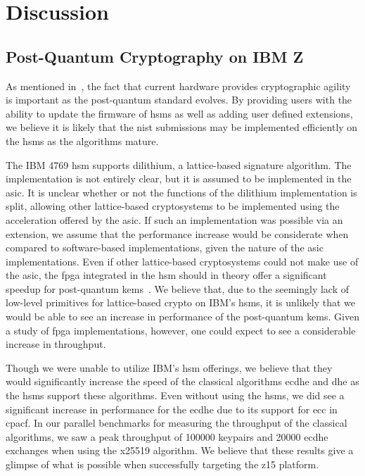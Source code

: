 \chapter{Discussion}
\label{chapter:discussion}

\section{Post-Quantum Cryptography on IBM Z}

As mentioned in~\cite{microsoft2020, ibm:z15:2019}, the fact that current hardware provides cryptographic agility is important as the \gls{post-quantum} standard evolves. By providing users with the ability to update the firmware of \glspl{hsm} as well as adding user defined extensions, we believe it is likely that the \gls{nist} submissions may be implemented efficiently on the \glspl{hsm} as the algorithms mature.

The IBM 4769 \gls{hsm} supports \gls{dilithium}, a lattice-based signature algorithm. The implementation is not entirely clear, but it is assumed to be implemented in the \gls{asic}. It is unclear whether or not the functions of the \gls{dilithium} implementation is split, allowing other lattice-based cryptosystems to be implemented using the acceleration offered by the \gls{asic}. If such an implementation was possible via an extension, we assume that the performance increase would be considerate when compared to software-based implementations, given the nature of the \gls{asic} implementations. Even if other lattice-based cryptosystems could not make use of the \gls{asic}, the \gls{fpga} integrated in the \gls{hsm} should in theory offer a significant speedup for \gls{post-quantum} \glspl{kem}~\cite{zhu2021, roy2020}. We believe that, due to the seemingly lack of low-level primitives for lattice-based crypto on IBM's \glspl{hsm}, it is unlikely that we would be able to see an increase in performance of the \gls{post-quantum} \glspl{kem}. Given a study of \gls{fpga} implementations, however, one could expect to see a considerable increase in throughput.

Though we were unable to utilize IBM's \gls{hsm} offerings, we believe that they would significantly increase the speed of the classical algorithms \gls{ecdhe} and \gls{dhe} as the \glspl{hsm} support these algorithms. Even without using the \glspl{hsm}, we did see a significant increase in performance for the \gls{ecdhe} due to its support for \gls{ecc} in \gls{cpacf}. In our parallel benchmarks for measuring the throughput of the classical algorithms, we saw a peak throughput of 100000 keypairs and 20000 \gls{ecdhe} exchanges when using the \gls{x25519} algorithm. We believe that these results give a glimpse of what is possible when successfully targeting the \gls{z15} platform. 

